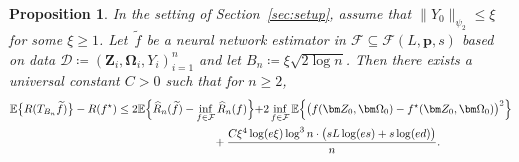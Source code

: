 \documentclass[12pt]{article}
\newcommand{\blue}[1]{\textcolor{blue}{#1}}
\newtheorem{prop}[thm]{Proposition}
\def\hat{\widehat}
\def\tilde{\widetilde}
\begin{document}
\begin{prop}\label{prop:oracle-inequality}
    In the setting of Section~\ref{sec:setup}, assume that $\|Y_0\|_{\psi_2} \leq \xi$ for some $\xi\geq 1$. Let~$\tilde{f}$ be a neural network estimator in $\mathcal{F}\subseteq \mathcal{F}(L,\bm p, s)$ based on data $\mathcal{D} \coloneqq (\bm Z_i,\bm \Omega_i,Y_i)_{i=1}^n$ and let $B_n \coloneqq \xi\sqrt{2\log n}$.  Then there exists a universal constant $C>0$ such that %
    for $n \geq 2$,
    \begin{equation*}
    \begin{aligned}
        \mathbb{E}\bigl\{ R(T_{B_n}\tilde{f})\bigr\} - R(f^{\star}) &\leq 2\mathbb{E}\Bigl\{ \hat{R}_n(\tilde{f}) - \inf_{f\in\mathcal{F}}\hat{R}_n(f) \Bigl\} + 2\inf_{f\in\mathcal{F}} \mathbb{E}\Bigl\{ \bigl(f(\bm Z_0,\bm \Omega_0) - f^{\star}(\bm Z_0,\bm \Omega_0)\bigr)^2 \Bigr\}\nonumber\\
        &\hspace{3cm} + \frac{C\xi^4\log(e\xi) \log^3 n \cdot \bigl(sL\log(es) + s\log(ed)\bigr)}{n}.
        \end{aligned}
    \end{equation*}
\end{prop}
\end{document}
